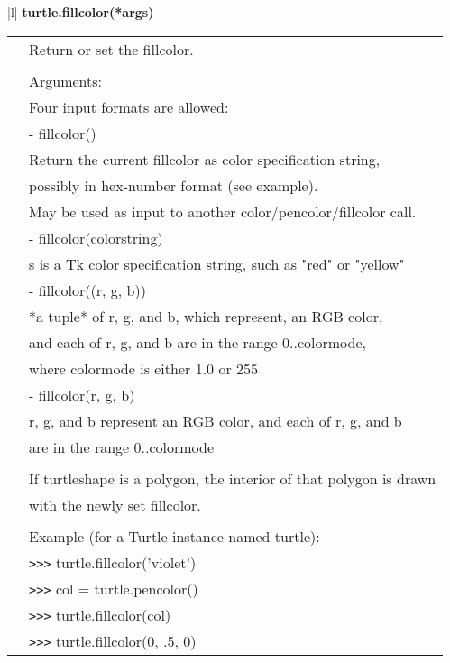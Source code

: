 \begin{center}
{\begin{tabular}{|l|}
{\bf    turtle.fillcolor(*args)} \\
   \begin{tabular}{p{0.25in}p{4in}}
&        Return or set the fillcolor. \\
&  \\
&        Arguments: \\
&        Four input formats are allowed: \\
&          - fillcolor() \\
&            Return the current fillcolor as color specification string, \\
&            possibly in hex-number format (see example). \\
&            May be used as input to another color/pencolor/fillcolor call. \\
&          - fillcolor(colorstring) \\
&            s is a Tk color specification string, such as "red" or "yellow" \\
&          - fillcolor((r, g, b)) \\
&            *a tuple* of r, g, and b, which represent, an RGB color, \\
&            and each of r, g, and b are in the range 0..colormode, \\
&            where colormode is either 1.0 or 255 \\
&          - fillcolor(r, g, b) \\
&            r, g, and b represent an RGB color, and each of r, g, and b \\
&            are in the range 0..colormode \\
&  \\
&        If turtleshape is a polygon, the interior of that polygon is drawn \\
&        with the newly set fillcolor. \\
&  \\
&        Example (for a Turtle instance named turtle): \\
&        \verb+>+\verb+>+\verb+>+ turtle.fillcolor('violet') \\
&        \verb+>+\verb+>+\verb+>+ col = turtle.pencolor() \\
&        \verb+>+\verb+>+\verb+>+ turtle.fillcolor(col) \\
&        \verb+>+\verb+>+\verb+>+ turtle.fillcolor(0, .5, 0) \\
\end{tabular} \\ \hline


\end{tabular}}
\end{center}
